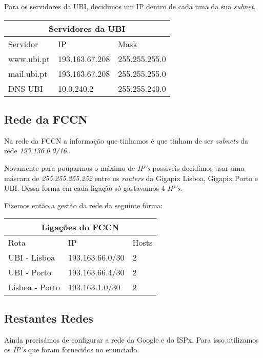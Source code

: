 \break
Para os servidores da UBI, decidimos um IP dentro de cada uma da sua \textit{subnet}.

\vspace{3mm}
\setlength{\tabcolsep}{20pt}
\renewcommand{\arraystretch}{1.5}
\noindent
\begin{tabular}{ |p{3cm}|p{3cm}|p{5cm}|}
  \hline
  \multicolumn{3}{|c|}{Servidores da UBI}      \\
  \hline
  Servidor    & IP             & Mask          \\
  \hline
  www.ubi.pt  & 193.163.67.208 & 255.255.255.0 \\
  mail.ubi.pt & 193.163.67.208 & 255.255.255.0 \\
  DNS UBI     & 10.0.240.2     & 255.255.240.0 \\
  \hline
\end{tabular}
\vspace{5mm}

\subsection{Rede da FCCN}
Na rede da FCCN a informação que tinhamos é que tinham de ser \textit{subnets} da rede
\textit{193.136.0.0/16}.

Novamente para pouparmos o máximo de \textit{IP's} possiveis decidimos usar
uma máscara de \textit{255.255.255.252} entre os \textit{routers} da
Gigapix Lisboa, Gigapix Porto e UBI. Dessa forma em cada ligação só gastavamos 4 \textit{IP's}.

Fizemos então a gestão da rede da seguinte forma:

\vspace{3mm}
\setlength{\tabcolsep}{20pt}
\renewcommand{\arraystretch}{1.5}
\noindent
\begin{tabular}{ |p{3cm}|p{3cm}|p{1cm}|}
  \hline
  \multicolumn{3}{|c|}{Ligações do FCCN}   \\
  \hline
  Rota           & IP              & Hosts \\
  \hline
  UBI - Lisboa   & 193.163.66.0/30 & 2     \\
  UBI - Porto    & 193.163.66.4/30 & 2     \\
  Lisboa - Porto & 193.163.1.0/30  & 2     \\

  \hline
\end{tabular}
\vspace{5mm}

\break
\subsection{Restantes Redes}
Ainda precisámos de configurar a rede da Google e do ISPx. Para isso utilizamos os \textit{IP's} que foram fornecidos no enunciado.

